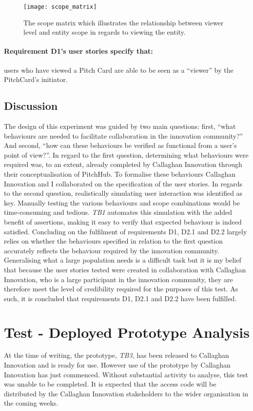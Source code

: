 \begin{figure}[ht]
    \centering
    \texttt{[image: scope\_matrix]}
    \caption{The scope matrix which illustrates the relationship between viewer level and entity scope in regards to viewing the entity.}
    \label{fig:architecturescope_matrix_evaluation}
\end{figure}

\paragraph{Requirement D1's user stories specify that:} users who have viewed a Pitch Card are able to be seen as a ``viewer'' by the PitchCard's initiator.

\subsection{Discussion}
The design of this experiment was guided by two main questions: first, ``what behaviours are needed to facilitate collaboration in the innovation community?'' And second, ``how can these behaviours be verified as functional from a user's point of view?''. In regard to the first question, determining what behaviours were required was, to an extent, already completed by Callaghan Innovation through their conceptualisation of PitchHub. To formalise these behaviours Callaghan Innovation and I collaborated on the specification of the user stories.
In regards to the second question, realistically simulating user interaction was identified as key. Manually testing the various behaviours and scope combinations would be time-consuming and tedious. \textit{TB1} automates this simulation with the added benefit of assertions, making it easy to verify that expected behaviour is indeed satisfied.
Concluding on the fulfilment of requirements D1, D2.1 and D2.2 largely relies on whether the behaviours specified in relation to the first question accurately reflects the behaviour required by the innovation community. Generalising what a large population needs is a difficult task but it is my belief that because the user stories tested were created in collaboration with Callaghan Innovation, who is a large participant in the innovation community, they are therefore meet the level of credibility required for the purposes of this test. As such, it is concluded that requirements D1, D2.1 and D2.2 have been fulfilled.

\section{Test  - Deployed Prototype Analysis}\label{S:test_2}
At the time of writing, the prototype, \textit{TB3}, has been released to Callaghan Innovation and is ready for use. However use of the prototype by Callaghan Innovation has just commenced. Without substantial activity to analyse, this test was unable to be completed. It is expected that the access code will be distributed by the Callaghan Innovation stakeholders to the wider organisation in the coming weeks.

